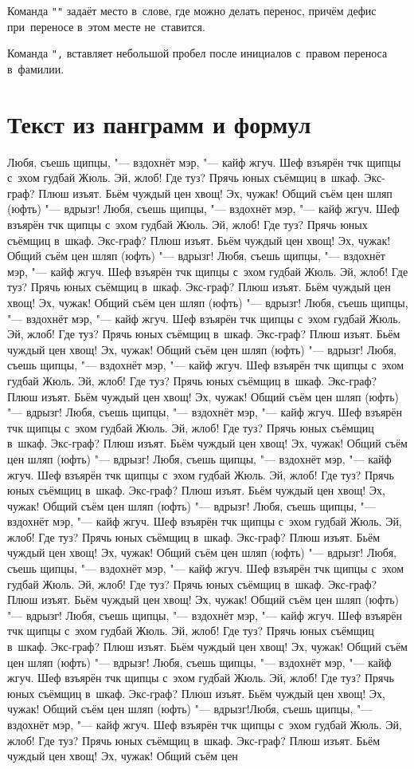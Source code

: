 Команда \verb|""| задаёт место в~слове, где можно делать перенос, причём дефис при~переносе в~этом месте не~ставится.

Команда \verb|",| вставляет небольшой пробел после инициалов с~правом переноса в~фамилии.

\section{Текст из панграмм и формул}

Любя, съешь щипцы, "--- вздохнёт мэр, "--- кайф жгуч. Шеф взъярён тчк щипцы с~эхом гудбай Жюль. Эй, жлоб! Где туз? Прячь юных съёмщиц в~шкаф. Экс-граф? Плюш изъят. Бьём чуждый цен хвощ! Эх, чужак! Общий съём цен шляп (юфть) "--- вдрызг! Любя, съешь щипцы, "--- вздохнёт мэр, "--- кайф жгуч. Шеф взъярён тчк щипцы с~эхом гудбай Жюль. Эй, жлоб! Где туз? Прячь юных съёмщиц в~шкаф. Экс-граф? Плюш изъят. Бьём чуждый цен хвощ! Эх, чужак! Общий съём цен шляп (юфть) "--- вдрызг! Любя, съешь щипцы, "--- вздохнёт мэр, "--- кайф жгуч. Шеф взъярён тчк щипцы с~эхом гудбай Жюль. Эй, жлоб! Где туз? Прячь юных съёмщиц в~шкаф. Экс-граф? Плюш изъят. Бьём чуждый цен хвощ! Эх, чужак! Общий съём цен шляп (юфть) "--- вдрызг! Любя, съешь щипцы, "--- вздохнёт мэр, "--- кайф жгуч. Шеф взъярён тчк щипцы с~эхом гудбай Жюль. Эй, жлоб! Где туз? Прячь юных съёмщиц в~шкаф. Экс-граф? Плюш изъят. Бьём чуждый цен хвощ! Эх, чужак! Общий съём цен шляп (юфть) "--- вдрызг! Любя, съешь щипцы, "--- вздохнёт мэр, "--- кайф жгуч. Шеф взъярён тчк щипцы с~эхом гудбай Жюль. Эй, жлоб! Где туз? Прячь юных съёмщиц в~шкаф. Экс-граф? Плюш изъят. Бьём чуждый цен хвощ! Эх, чужак! Общий съём цен шляп (юфть) "--- вдрызг! Любя, съешь щипцы, "--- вздохнёт мэр, "--- кайф жгуч. Шеф взъярён тчк щипцы с~эхом гудбай Жюль. Эй, жлоб! Где туз? Прячь юных съёмщиц в~шкаф. Экс-граф? Плюш изъят. Бьём чуждый цен хвощ! Эх, чужак! Общий съём цен шляп (юфть) "--- вдрызг! Любя, съешь щипцы, "--- вздохнёт мэр, "--- кайф жгуч. Шеф взъярён тчк щипцы с~эхом гудбай Жюль. Эй, жлоб! Где туз? Прячь юных съёмщиц в~шкаф. Экс-граф? Плюш изъят. Бьём чуждый цен хвощ! Эх, чужак! Общий съём цен шляп (юфть) "--- вдрызг! Любя, съешь щипцы, "--- вздохнёт мэр, "--- кайф жгуч. Шеф взъярён тчк щипцы с~эхом гудбай Жюль. Эй, жлоб! Где туз? Прячь юных съёмщиц в~шкаф. Экс-граф? Плюш изъят. Бьём чуждый цен хвощ! Эх, чужак! Общий съём цен шляп (юфть) "--- вдрызг! Любя, съешь щипцы, "--- вздохнёт мэр, "--- кайф жгуч. Шеф взъярён тчк щипцы с~эхом гудбай Жюль. Эй, жлоб! Где туз? Прячь юных съёмщиц в~шкаф. Экс-граф? Плюш изъят. Бьём чуждый цен хвощ! Эх, чужак! Общий съём цен шляп (юфть) "--- вдрызг! Любя, съешь щипцы, "--- вздохнёт мэр, "--- кайф жгуч. Шеф взъярён тчк щипцы с~эхом гудбай Жюль. Эй, жлоб! Где туз? Прячь юных съёмщиц в~шкаф. Экс-граф? Плюш изъят. Бьём чуждый цен хвощ! Эх, чужак! Общий съём цен шляп (юфть) "--- вдрызг! Любя, съешь щипцы, "--- вздохнёт мэр, "--- кайф жгуч. Шеф взъярён тчк щипцы с~эхом гудбай Жюль. Эй, жлоб! Где туз? Прячь юных съёмщиц в~шкаф. Экс-граф? Плюш изъят. Бьём чуждый цен хвощ! Эх, чужак! Общий съём цен шляп (юфть) "--- вдрызг!Любя, съешь щипцы, "--- вздохнёт мэр, "--- кайф жгуч. Шеф взъярён тчк щипцы с~эхом гудбай Жюль. Эй, жлоб! Где туз? Прячь юных съёмщиц в~шкаф. Экс-граф? Плюш изъят. Бьём чуждый цен хвощ! Эх, чужак! Общий съём цен

